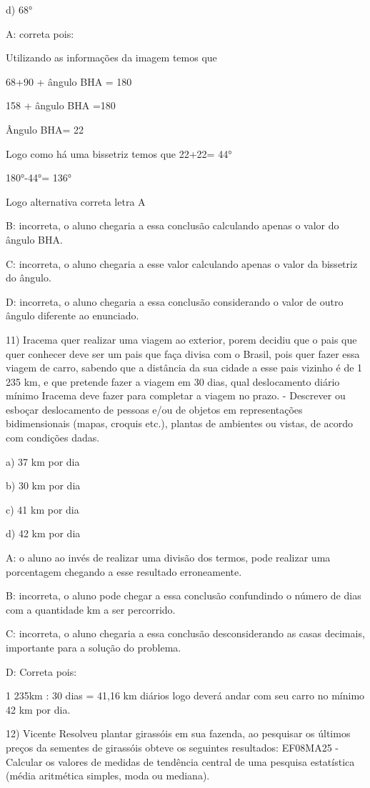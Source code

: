 d) 68°

A: correta pois:

Utilizando as informações da imagem temos que

68+90 + ângulo BHA = 180

158 + ângulo BHA =180

Ângulo BHA= 22

Logo como há uma bissetriz temos que 22+22= 44°

180°-44°= 136°

Logo alternativa correta letra A

B: incorreta, o aluno chegaria a essa conclusão calculando apenas o
valor do ângulo BHA.

C: incorreta, o aluno chegaria a esse valor calculando apenas o valor da
bissetriz do ângulo.

D: incorreta, o aluno chegaria a essa conclusão considerando o valor de
outro ângulo diferente ao enunciado.

11) Iracema quer realizar uma viagem ao exterior, porem decidiu que o
pais que quer conhecer deve ser um pais que faça divisa com o Brasil,
pois quer fazer essa viagem de carro, sabendo que a distância da sua
cidade a esse pais vizinho é de 1 235 km, e que pretende fazer a viagem
em 30 dias, qual deslocamento diário mínimo Iracema deve fazer para
completar a viagem no prazo. - Descrever ou esboçar deslocamento de
pessoas e/ou de objetos em representações bidimensionais (mapas, croquis
etc.), plantas de ambientes ou vistas, de acordo com condições dadas.

a) 37 km por dia

b) 30 km por dia

c) 41 km por dia

d) 42 km por dia

A: o aluno ao invés de realizar uma divisão dos termos, pode realizar
uma porcentagem chegando a esse resultado erroneamente.

B: incorreta, o aluno pode chegar a essa conclusão confundindo o número
de dias com a quantidade km a ser percorrido.

C: incorreta, o aluno chegaria a essa conclusão desconsiderando as casas
decimais, importante para a solução do problema.

D: Correta pois:

1 235km : 30 dias = 41,16 km diários logo deverá andar com seu carro no
mínimo 42 km por dia.

12) Vicente Resolveu plantar girassóis em sua fazenda, ao pesquisar os
últimos preços da sementes de girassóis obteve os seguintes resultados:
EF08MA25 - Calcular os valores de medidas de tendência central de uma
pesquisa estatística (média aritmética simples, moda ou mediana).

